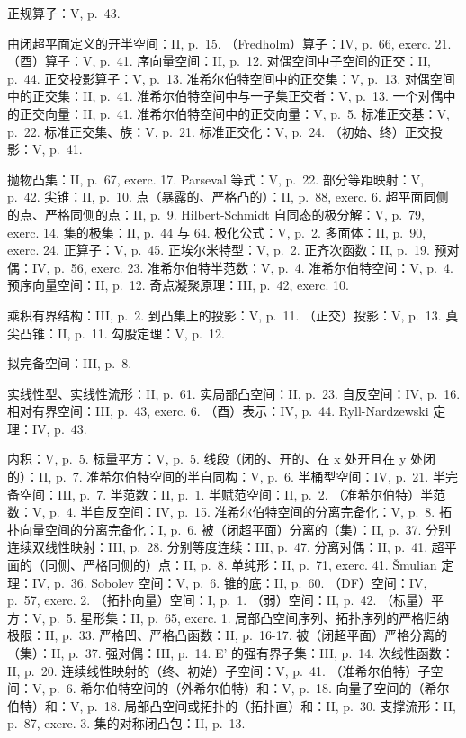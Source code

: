 正规算子：V, p.~43.

由闭超平面定义的开半空间：II, p.~15. （Fredholm）算子：IV, p.~66, exerc. 21. （酉）算子：V, p.~41. 序向量空间：II, p.~12. 对偶空间中子空间的正交：II, p.~44. 正交投影算子：V, p.~13. 准希尔伯特空间中的正交集：V, p.~13. 对偶空间中的正交集：II, p.~41. 准希尔伯特空间中与一子集正交者：V, p.~13. 一个对偶中的正交向量：II, p.~41. 准希尔伯特空间中的正交向量：V, p.~5. 标准正交基：V, p.~22. 标准正交集、族：V, p.~21. 标准正交化：V, p.~24. （初始、终）正交投影：V, p.~41.

抛物凸集：II, p.~67, exerc. 17. Parseval 等式：V, p.~22. 部分等距映射：V, p.~42. 尖锥：II, p.~10. 点（暴露的、严格凸的）：II, p.~88, exerc. 6. 超平面同侧的点、严格同侧的点：II, p.~9. Hilbert-Schmidt 自同态的极分解：V, p.~79, exerc. 14. 集的极集：II, p.~44 与 64. 极化公式：V, p.~2. 多面体：II, p.~90, exerc. 24. 正算子：V, p.~45. 正埃尔米特型：V, p.~2. 正齐次函数：II, p.~19. 预对偶：IV, p.~56, exerc. 23. 准希尔伯特半范数：V, p.~4. 准希尔伯特空间：V, p.~4. 预序向量空间：II, p.~12. 奇点凝聚原理：III, p.~42, exerc. 10.

乘积有界结构：III, p.~2. 到凸集上的投影：V, p.~11. （正交）投影：V, p.~13. 真尖凸锥：II, p.~11. 勾股定理：V, p.~12.

拟完备空间：III, p.~8.

实线性型、实线性流形：II, p.~61. 实局部凸空间：II, p.~23. 自反空间：IV, p.~16. 相对有界空间：III, p.~43, exerc. 6. （酉）表示：IV, p.~44. Ryll-Nardzewski 定理：IV, p.~43.

内积：V, p.~5. 标量平方：V, p.~5. 线段（闭的、开的、在 x 处开且在 y 处闭的）：II, p.~7. 准希尔伯特空间的半自同构：V, p.~6. 半桶型空间：IV, p.~21. 半完备空间：III, p.~7. 半范数：II, p.~1. 半赋范空间：II, p.~2. （准希尔伯特）半范数：V, p.~4. 半自反空间：IV, p.~15. 准希尔伯特空间的分离完备化：V, p.~8. 拓扑向量空间的分离完备化：I, p.~6. 被（闭超平面）分离的（集）：II, p.~37. 分别连续双线性映射：III, p.~28. 分别等度连续：III, p.~47. 分离对偶：II, p.~41. 超平面的（同侧、严格同侧的）点：II, p.~8. 单纯形：II, p.~71, exerc. 41. Šmulian 定理：IV, p.~36. Sobolev 空间：V, p.~6. 锥的底：II, p.~60. （DF）空间：IV, p.~57, exerc. 2. （拓扑向量）空间：I, p.~1. （弱）空间：II, p.~42. （标量）平方：V, p.~5. 星形集：II, p.~65, exerc. 1. 局部凸空间序列、拓扑序列的严格归纳极限：II, p.~33. 严格凹、严格凸函数：II, p.~16-17. 被（闭超平面）严格分离的（集）：II, p.~37. 强对偶：III, p.~14. E' 的强有界子集：III, p.~14. 次线性函数：II, p.~20. 连续线性映射的（终、初始）子空间：V, p.~41. （准希尔伯特）子空间：V, p.~6. 希尔伯特空间的（外希尔伯特）和：V, p.~18. 向量子空间的（希尔伯特）和：V, p.~18. 局部凸空间或拓扑的（拓扑直）和：II, p.~30. 支撑流形：II, p.~87, exerc. 3. 集的对称闭凸包：II, p.~13.

